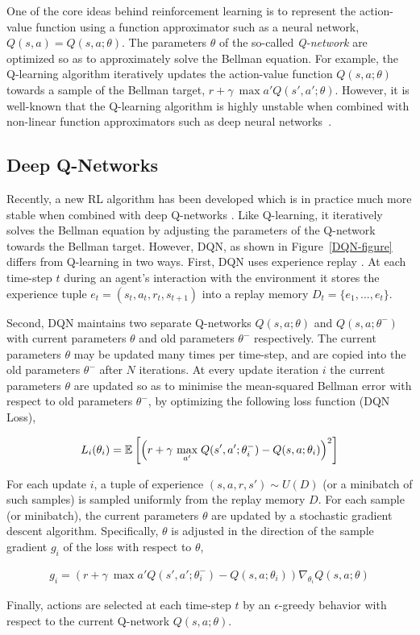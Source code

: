 \documentclass{article}
\begin{document}
One of the core ideas behind reinforcement learning is to represent the action-value function using a function approximator such as a neural network, $Q(s,a) = Q(s,a; \theta)$. The parameters $\theta$ of the so-called \emph{Q-network} are optimized so as to approximately solve the Bellman equation. For example, the Q-learning algorithm iteratively updates the action-value function $Q(s,a; \theta)$ towards a sample of the Bellman target, $r + \gamma \ \max{a'}{Q(s',a'; \theta)}$. However, it is well-known that the Q-learning algorithm is highly unstable when combined with non-linear function approximators such as deep neural networks~\cite{tsitsiklis-convergence}. 

\subsection{Deep Q-Networks}
Recently, a new RL algorithm has been developed which is in practice much more stable when combined with deep Q-networks \cite{mnih2013atari,mnih-dqn-2015}. Like Q-learning, it iteratively solves the Bellman equation by adjusting the parameters of the Q-network towards the Bellman target. However, DQN, as shown in Figure~\ref{DQN-figure} differs from Q-learning in two ways. First, DQN uses experience replay \cite{lin1993reinforcement}. At each time-step $t$ during an agent's interaction with the environment it stores the experience tuple $e_t = (s_t, a_t, r_t, s_{t+1})$ into a replay memory $D_t = \{e_1, ..., e_t\}$. 

Second, DQN maintains two separate Q-networks $Q(s,a; \theta)$ and $Q(s,a; \theta^-)$ with current parameters $\theta$ and old parameters $\theta^-$ respectively. The current parameters $\theta$ may be updated many times per time-step, and are copied into the old parameters $\theta^-$ after $N$ iterations. At every update iteration $i$ the current parameters $\theta$ are updated so as to minimise the mean-squared Bellman error with respect to old parameters $\theta^-$, by optimizing the following loss function (DQN Loss),
\begin{small}
\begin{align}
L_i(\theta_i) = \mathbb{E}_{} \left[ \left( r + \gamma \ \underset{a'}{\operatorname{max}}\; Q(s', a'; \theta_i^-) - Q(s, a; \theta_i) \right)^2 \right]
\end{align}
\end{small}
For each update $i$, a tuple of experience $(s,a,r,s') \sim U(D)$ (or a minibatch of such samples) is sampled uniformly from the replay memory $D$. For each sample (or minibatch), the current parameters $\theta$ are updated by a stochastic gradient descent algorithm. Specifically, $\theta$ is adjusted in the direction of the sample gradient $g_i$ of the loss with respect to $\theta$,
\begin{small}
\begin{align}
g_i = \left( r + \gamma \ \max{a'} Q(s', a'; \theta_i^-) - Q(s, a; \theta_i) \right) \nabla_{\theta_i} Q(s,a; \theta)
\label{eqn:dqngrad}
\end{align}
\end{small}
Finally, actions are selected at each time-step $t$ by an $\epsilon$-greedy behavior with respect to the current Q-network $Q(s,a;\theta)$.
\end{document}
